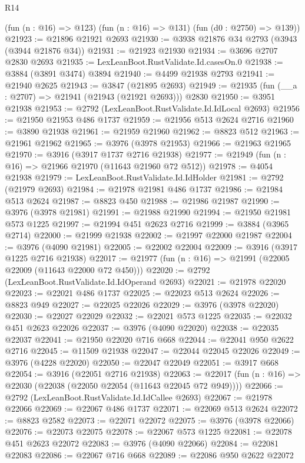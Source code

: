 \begin{lexlean}{R14}
\begin{coremodule}
      (fun (n : @16) => @123)
      (fun (n : @16) => @131)
      (fun (d0 : @2750) => @139))
@21923 := @21896 @21921 @2693
@21930 := @3938 @21876 @34 @2793 (@3943 (@3944 @21876 @34))
@21931 := @21923 @21930
@21934 := @3696 @2707 @2830 @2693
@21935 := LexLeanBoot.RustValidate.Id.casesOn.{0}
@21938 := @3884 (@3891 @3474) @3894
@21940 := @4499 @21938 @2793
@21941 := @21940 @2625
@21943 := @3847 (@21895 @2693)
@21949 := @21935 (fun (__a : @2707) => @21941 (@21943 (@21921 @2693))) @2830
@21950 := @3951 @21938
@21953 := @2792 (LexLeanBoot.RustValidate.Id.IdLocal @2693)
@21956 := @21950 @21953 @486 @1737
@21959 := @21956 @513 @2624 @2716
@21960 := @3890 @21938
@21961 := @21959 @21960
@21962 := @8823 @512
@21963 := @21961 @21962
@21965 := @3976 (@3978 @21953)
@21966 := @21963 @21965
@21970 := @3916 (@3917 @1737 @2716 @21938)
@21977 := @21949 (fun (n : @16) => @21966 @21970 (@11643 @21960 @72 @512))
@21978 := @4054 @21938
@21979 := LexLeanBoot.RustValidate.Id.IdHolder
@21981 := @2792 (@21979 @2693)
@21984 := @21978 @21981 @486 @1737
@21986 := @21984 @513 @2624
@21987 := @8823 @450
@21988 := @21986 @21987
@21990 := @3976 (@3978 @21981)
@21991 := @21988 @21990
@21994 := @21950 @21981 @573 @1225
@21997 := @21994 @451 @2623 @2716
@21999 := @3884 (@3965 @2714)
@22000 := @21999 @21938
@22002 := @21997 @22000 @21987
@22004 := @3976 (@4090 @21981)
@22005 := @22002 @22004
@22009 := @3916 (@3917 @1225 @2716 @21938)
@22017 := @21977 (fun (n : @16) => @21991 (@22005 @22009 (@11643 @22000 @72 @450)))
@22020 := @2792 (LexLeanBoot.RustValidate.Id.IdOperand @2693)
@22021 := @21978 @22020
@22023 := @22021 @486 @1737
@22025 := @22023 @513 @2624
@22026 := @8823 @949
@22027 := @22025 @22026
@22029 := @3976 (@3978 @22020)
@22030 := @22027 @22029
@22032 := @22021 @573 @1225
@22035 := @22032 @451 @2623 @22026
@22037 := @3976 (@4090 @22020)
@22038 := @22035 @22037
@22041 := @21950 @22020 @716 @668
@22044 := @22041 @950 @2622 @2716
@22045 := @11509 @21938
@22047 := @22044 @22045 @22026
@22049 := @3976 (@4228 @22020)
@22050 := @22047 @22049
@22051 := @3917 @668
@22054 := @3916 (@22051 @2716 @21938)
@22063 := @22017 (fun (n : @16) => @22030 (@22038 (@22050 @22054 (@11643 @22045 @72 @949))))
@22066 := @2792 (LexLeanBoot.RustValidate.Id.IdCallee @2693)
@22067 := @21978 @22066
@22069 := @22067 @486 @1737
@22071 := @22069 @513 @2624
@22072 := @8823 @2582
@22073 := @22071 @22072
@22075 := @3976 (@3978 @22066)
@22076 := @22073 @22075
@22078 := @22067 @573 @1225
@22081 := @22078 @451 @2623 @22072
@22083 := @3976 (@4090 @22066)
@22084 := @22081 @22083
@22086 := @22067 @716 @668
@22089 := @22086 @950 @2622 @22072

\end{coremodule}
\end{lexlean}
